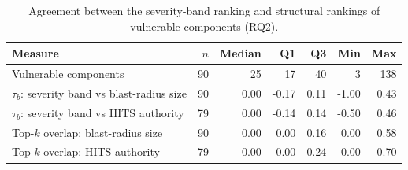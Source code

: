 \begin{table}[!htpb]
    \centering
    \small
    \caption{Agreement between the severity-band ranking and structural rankings of vulnerable components (RQ2).}
    \label{tab:eval-rq2}
    \begin{tabular}{lrrrrrr}
        \toprule
        \textbf{Measure} & \(n\) & \textbf{Median} & \textbf{Q1} & \textbf{Q3} & \textbf{Min} & \textbf{Max} \\
        \midrule
        Vulnerable components & 90 & 25 & 17 & 40 & 3 & 138 \\
        \(\tau_b\): severity band vs blast-radius size & 90 & 0.00 & -0.17 & 0.11 & -1.00 & 0.43 \\
        \(\tau_b\): severity band vs HITS authority & 79 & 0.00 & -0.14 & 0.14 & -0.50 & 0.46 \\
        Top-\(k\) overlap: blast-radius size & 90 & 0.00 & 0.00 & 0.16 & 0.00 & 0.58 \\
        Top-\(k\) overlap: HITS authority & 79 & 0.00 & 0.00 & 0.24 & 0.00 & 0.70 \\
        \bottomrule
    \end{tabular}
\end{table}
